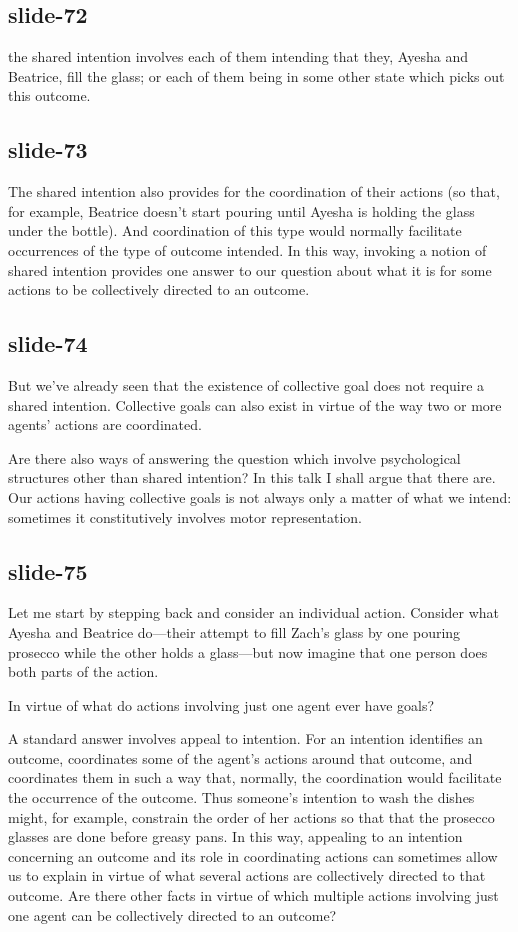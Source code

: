 \documentclass[12pt,\papersize]{extarticle}
\begin{document}
\subsection{slide-72}
the shared intention involves each of them intending that they, Ayesha and Beatrice, fill the glass;
or each of them being in some other state which picks out this outcome.

\subsection{slide-73}
The shared intention also provides for the coordination of their actions (so that, for example,
Beatrice doesn't start pouring until Ayesha is holding the glass under the bottle).  And
coordination of this type would normally facilitate occurrences of the type of outcome intended.
In this way, invoking a notion of shared intention provides one answer to our question about what
it is for some actions to be collectively directed to an outcome.

\subsection{slide-74}
But we’ve already seen that the existence of collective goal does not
require a shared intention.  Collective goals can also exist in virtue of
the way two or more agents’ actions are coordinated.

Are there also ways of answering the question which involve psychological structures
other than shared intention? In this talk I shall argue that there are.
Our actions having collective goals is not always only a matter of what we intend:
sometimes it constitutively involves motor representation.

\subsection{slide-75}
Let me start by stepping back and consider an individual action.
Consider what Ayesha and Beatrice do---their attempt to fill Zach's glass by one pouring prosecco while the
other holds a glass---but now imagine that one person does both parts of the action.

In virtue of what do actions involving just one agent ever have goals?

A standard answer involves appeal to intention.
For an intention identifies an outcome, coordinates some of the agent’s actions around that outcome, and coordinates them in such a way that, normally, the coordination would facilitate the occurrence of the outcome.
Thus someone's intention to wash the dishes might, for example, constrain the order of her actions so that that the prosecco glasses are done before greasy pans.
In this way, appealing to an intention concerning an outcome and its role in coordinating actions can sometimes allow us to explain in virtue of what several actions are collectively directed to that outcome.
Are there other facts in virtue of which  multiple actions involving just one agent can be collectively directed to an outcome?
\end{document}
